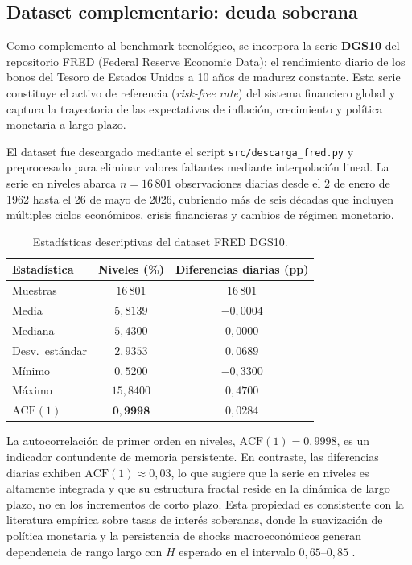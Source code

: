 \subsection{Dataset complementario: deuda soberana}

Como complemento al benchmark tecnológico, se incorpora la serie \textbf{DGS10}
del repositorio FRED (Federal Reserve Economic Data): el rendimiento diario de
los bonos del Tesoro de Estados Unidos a 10 años de madurez constante. Esta
serie constituye el activo de referencia (\textit{risk-free rate}) del sistema
financiero global y captura la trayectoria de las expectativas de inflación,
crecimiento y política monetaria a largo plazo.

El dataset fue descargado mediante el script \texttt{src/descarga\_fred.py} y
preprocesado para eliminar valores faltantes mediante interpolación lineal. La
serie en niveles abarca $n = 16\,801$ observaciones diarias desde el
2 de enero de 1962 hasta el 26 de mayo de 2026, cubriendo más de seis décadas
que incluyen múltiples ciclos económicos, crisis financieras y cambios de
régimen monetario.

\begin{table}[H]
\centering
\caption{Estadísticas descriptivas del dataset FRED DGS10.}
\label{tab:dgs10-stats}
\begin{tabular}{lcc}
\toprule
\textbf{Estadística} & \textbf{Niveles (\%)} & \textbf{Diferencias diarias (pp)} \\
\midrule
Muestras & $16\,801$ & $16\,801$ \\
Media & $5{,}8139$ & $-0{,}0004$ \\
Mediana & $5{,}4300$ & $0{,}0000$ \\
Desv.~estándar & $2{,}9353$ & $0{,}0689$ \\
Mínimo & $0{,}5200$ & $-0{,}3300$ \\
Máximo & $15{,}8400$ & $0{,}4700$ \\
$\text{ACF}(1)$ & $\mathbf{0{,}9998}$ & $0{,}0284$ \\
\bottomrule
\end{tabular}
\end{table}

La autocorrelación de primer orden en niveles, $\text{ACF}(1)=0{,}9998$, es un
indicador contundente de memoria persistente. En contraste, las diferencias
diarias exhiben $\text{ACF}(1)\approx0{,}03$, lo que sugiere que la serie en
niveles es altamente integrada y que su estructura fractal reside en la
dinámica de largo plazo, no en los incrementos de corto plazo. Esta propiedad
es consistente con la literatura empírica sobre tasas de interés soberanas,
donde la suavización de política monetaria y la persistencia de shocks
macroeconómicos generan dependencia de rango largo con $H$ esperado en el
intervalo $0{,}65$--$0{,}85$
\cite{backus1993long,mcarthur1995hurst,bariviera2018efficiency}.


